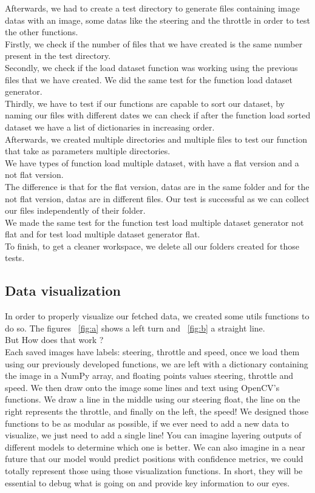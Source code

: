 \documentclass[12pt]{article}
\begin{document}
Afterwards, we had to create a test directory to generate files containing image datas with an image, some datas like the steering and the throttle in order to test the other functions. \\ 
Firstly, we check if the number of files that we have created is the same number present in the test directory. \\ 
Secondly, we check if the load dataset function was working using the previous files that we have created. We did the same test for the function load dataset generator. \\ 
Thirdly, we have to test if our functions are capable to sort our dataset, by naming our files with different dates we can check if after the function load sorted dataset we have a list of dictionaries in increasing order. \\ 
Afterwards, we created multiple directories and multiple files to test our function that take as parameters multiple directories. \\ 
We have types of function load multiple dataset, with have a flat version and a not flat version. \\ 
The difference is that for the flat version, datas are in the same folder and for the not flat version, datas are in different files. Our test is successful as we can collect our files independently of their folder. \\ 
We made the same test for the function test load multiple dataset generator not flat and for test load multiple dataset generator flat. \\ 
To finish, to get a cleaner workspace, we delete all our folders created for those tests. \\ 

\newpage

\subsection{Data visualization}
In order to properly visualize our fetched data, we created some utils functions to do so.
The figures ~\ref{fig:a} shows a left turn and ~\ref{fig:b} a straight line. \\ But How does that work ? \\ Each saved images have labels: steering, throttle and speed, once we load them using our previously developed functions, we are left with a dictionary containing the image in a NumPy array, and floating points values steering, throttle and speed. We then draw onto the image some lines and text using OpenCV's functions. We draw a line in the middle using our steering float, the line on the right represents the throttle, and finally on the left, the speed! We designed those functions to be as modular as possible, if we ever need to add a new data to visualize, we just need to add a single line! You can imagine layering outputs of different models to determine which one is better. We can also imagine in a near future that our model would predict positions with confidence metrics, we could totally represent those using those visualization functions. In short, they will be essential to debug what is going on and provide key information to our eyes.
\end{document}
